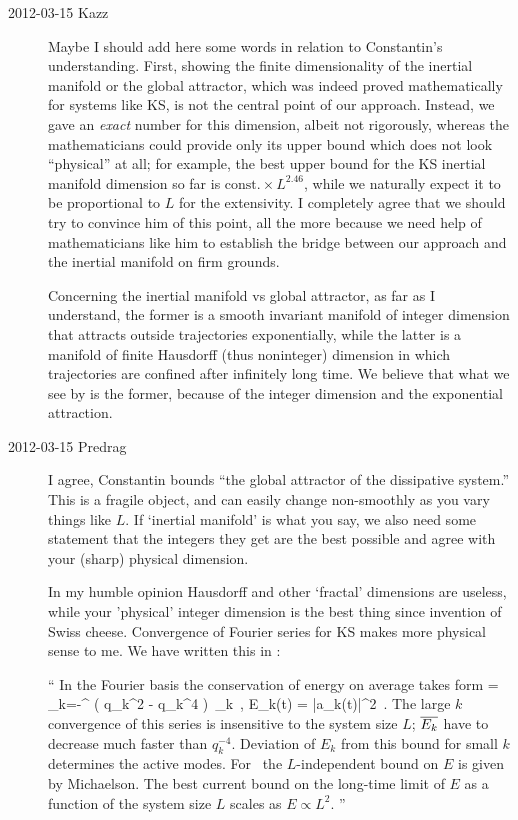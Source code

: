 \begin{description}
\item[2012-03-15 Kazz]
  Maybe I should add here some words in relation to Constantin's understanding.
  First, showing the finite dimensionality of the inertial manifold
  or the global attractor, which was indeed proved mathematically
  for systems like KS,
  is not the central point of our {\cLv} approach.
  Instead, we gave an \textit{exact} number for this dimension,
  albeit not rigorously, whereas the mathematicians could provide
  only its upper bound which does not look ``physical'' at all;
  for example, the best upper bound for the KS inertial manifold dimension
  so far is $\text{const.} \times L^{2.46}$, while we naturally expect it
  to be proportional to $L$ for the extensivity.
  I completely agree that we should try to convince him of this point,
  all the more because we need help of mathematicians like him to establish
  the bridge between our {\cLv} approach and the inertial manifold
  on firm grounds.

  Concerning the inertial manifold vs global attractor, as far as I
  understand, the former is a smooth invariant manifold of integer
  dimension that attracts outside trajectories exponentially, while the
  latter is a manifold of finite Hausdorff (thus noninteger) dimension in
  which trajectories are confined after infinitely long time.
  We believe that what we see by {\cLvs} is the former,
  because of the integer dimension and the exponential attraction.

\item[2012-03-15 Predrag] I agree, Constantin bounds ``the global
  attractor of the dissipative system.'' This is a fragile object, and
  can easily change non-smoothly as you vary things like $L$. If
  `inertial manifold' is what you say, we also need some statement that
  the integers they get are the best possible and agree with your (sharp)
  physical dimension.

  In my humble opinion Hausdorff and other `fractal' dimensions are
  useless, while your 'physical' integer dimension is the best thing since
  invention of Swiss cheese. Convergence of Fourier series for KS makes
  more physical sense to me. We have written this in :

  ``
  In the Fourier basis the conservation of energy on average takes form
   = \sum_{k=-\infty}^{\infty} ( q_k^2 - q_k^4 )\,
  _k
  \,,\qquad
  E_k(t) =  {\textstyle{}} |a_k(t)|^2
  \,.
  The large $k$ convergence of this series is insensitive to the system
  size $L$; $\overline{E_k}$ have to decrease much faster than $q_k^{-4}$.
  Deviation of $E_k$ from this bound for small $k$ determines the active
  modes. For \eqva\ the $L$-independent bound on $E$ is given by
  Michaelson. The best current bound
  on the long-time limit of $E$ as a function of the system size $L$ scales
  as $E \propto L^{2}$.
  ''


\end{description}
